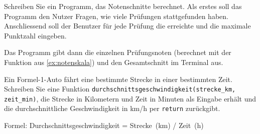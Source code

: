 \begin{myexercise}
	Schreiben Sie ein Programm, das Notenschnitte berechnet. Als erstes soll das Programm den Nutzer Fragen, wie viele Prüfungen stattgefunden haben. Anschliessend soll der Benutzer für jede Prüfung die erreichte und die maximale Punktzahl eingeben.

	Das Programm gibt dann die einzelnen Prüfungsnoten (berechnet mit der Funktion aus \cref{ex:notenskala}) und den Gesamtschnitt im Terminal aus.
	\begin{myanswer}
		
	\end{myanswer}

\end{myexercise}

\begin{myexercise}\label{ex:f1}
	Ein Formel-1-Auto fährt eine bestimmte Strecke in einer bestimmten Zeit. Schreiben Sie eine Funktion \lstinline|durchschnittsgeschwindigkeit(strecke_km, zeit_min)|, die Strecke in Kilometern und Zeit in Minuten als Eingabe erhält und die durchschnittliche Geschwindigkeit in km/h per \lstinline|return| zurückgibt.

	Formel: Durchschnittsgeschwindigkeit = Strecke (km) / Zeit (h)

	\begin{myanswer}
		
	\end{myanswer}
\end{myexercise}

